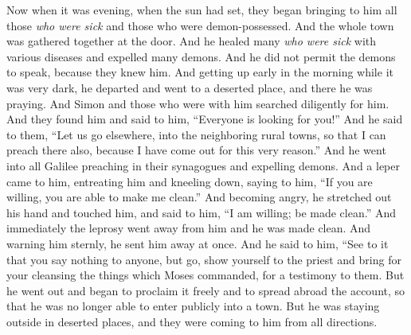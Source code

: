 \begin{biblechapter}
\verse Now when it was evening, when the sun had set, they began bringing to him all those \textit{who were sick} and those who were demon-possessed.
\verse And the whole town was gathered together at the door.
\verse And he healed many \textit{who were sick} with various diseases and expelled many demons. And he did not permit the demons to speak, because they knew him.
 And getting up early in the morning while it was very dark, he departed and went to a deserted place, and there he was praying.
\verse And Simon and those who were with him searched diligently for him.
\verse And they found him and said to him, “Everyone is looking for you!”
\verse And he said to them, “Let us go elsewhere, into the neighboring rural towns, so that I can preach there also, because I have come out for this very reason.”
\verse And he went into all Galilee preaching in their synagogues and expelling demons.
 And a leper came to him, entreating him and kneeling down, saying to him, “If you are willing, you are able to make me clean.”
\verse And becoming angry, he stretched out his hand and touched him, and said to him, “I am willing; be made clean.”
\verse And immediately the leprosy went away from him and he was made clean.
\verse And warning him sternly, he sent him away at once.
\verse And he said to him, “See to it that you say nothing to anyone, but go, show yourself to the priest and bring for your cleansing the things which Moses commanded, for a testimony to them.
\verse But he went out and began to proclaim it freely and to spread abroad the account, so that he was no longer able to enter publicly into a town. But he was staying outside in deserted places, and they were coming to him from all directions.
\end{biblechapter}

